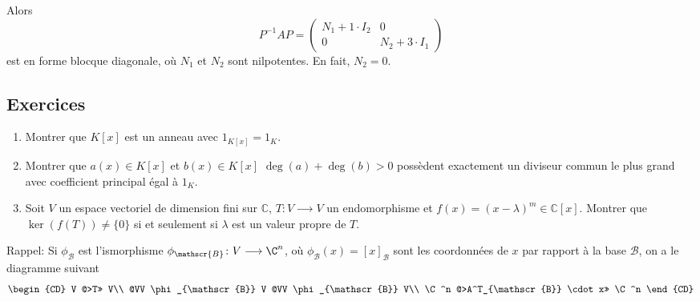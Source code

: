 \begin{remark}
\begin{example}
Alors
\begin{displaymath} 
P^{-1}AP =
\begin{pmatrix}
  N_1 +  1 ⋅I_2 & 0 \\
  0         & N_2 + 3  ⋅ I_1
\end{pmatrix}
\end{displaymath}
est en forme blocque diagonale, où $N_1$ et $N_2$ sont nilpotentes. En fait, $N_2=0$. 
\end{example}

\subsection*{Exercices}
\label{sec:exercices}
\begin{enumerate}
\item Montrer que $K[x]$ est un anneau avec $1_{K[x]} = 1_K$.  
\item Montrer que  $a(x) \in K[x]$ et $b(x) \in K[x]$ $\deg(a)+\deg(b)>0$  possèdent exactement un diviseur commun le plus grand avec coefficient principal égal à $1_K$.  
\item Soit $V$ un espace vectoriel de dimension fini sur $ℂ$,  $T : V ⟶V$ un endomorphisme et $f(x) = (x - λ)^m ∈ ℂ[x]$. Montrer que $\ker(f(T)) \neq \{0\}$ si et seulement si $λ$ est un valeur propre de $T$. 
\end{enumerate}






Rappel: Si  $\phi_{\mathscr{B}}$ est l'ismorphisme $\phi_{\mathscr{B}} \colon V \longrightarrow \C^n$, où $\phi_{\mathscr{B}}(x) = [x]_{\mathscr{B}}$ sont les coordonnées de $x$ par rapport à la base ${\mathscr{B}}$,  on a le diagramme suivant 
\begin{displaymath}
  {
  \begin{CD}
    V     @>T>>  V\\
    @VV \phi_{\mathscr{B}} V        @VV \phi_{\mathscr{B}} V\\ 
    \C^n     @>A^T_{\mathscr{B}} \cdot x>>  \C^n
  \end{CD}} 
\end{displaymath} 
\end{remark}

